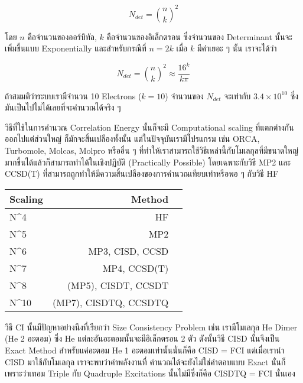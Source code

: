\begin{equation}
    N_{det} = \binom{n}{k}^{2}
\end{equation}

\noindent โดย $n$ คือจำนวนของออร์บิทัล, $k$ คือจำนวนของอิเล็กตรอน ซึ่งจำนวนของ Determinant
นั้นจะเพิ่มขึ้นแบบ Exponentially และสำหรับกรณีที่ $n = 2k$ เมื่อ $k$ มีค่าเยอะ ๆ นั้น เราจะได้ว่า

\begin{equation}
    N_{det} = \binom{n}{k}^{2} \approx \frac{16^k}{k\pi}
\end{equation}

ถ้าสมมติว่าระบบเรามีจำนวน 10 Electrons ($k = 10$) จำนวนของ $N_{det}$ จะเท่ากับ $3.4 \times 10^{10}$
ซึ่งมันเป็นไปไม่ได้เลยที่จะคำนวณได้จริง ๆ

วิธีที่ใช้ในการคำนวณ Correlation Energy นั้นก็จะมี Computational scaling ที่แตกต่างกันออกไปแต่ส่วนใหญ่%
ก็มักจะสิ้นเปลืองทั้งนั้น แต่ในปัจจุบันเรามีโปรแกรม เช่น ORCA, Turbomole, Molcas, Molpro หรืออื่น ๆ
ที่ทำให้เราสามารถใช้วิธีเหล่านี้กับโมเลกุลที่มีขนาดใหญ่มากขึ้นได้แล้วก็สามารถทำได้ในเชิงปฏิบัติ (Practically Possible)
โดยเฉพาะกับวิธี MP2 และ CCSD(T) ที่สามารถถูกทำให้มีความสิ้นเปลืองของการคำนวณเทียบเท่าหรือพอ ๆ กับวิธี HF

\begin{table}[!htp]
    \Large
    \centering
    \begin{tabular}{lrr}\toprule
        Scaling & Method                \\\midrule
        N^4     & HF                    \\
        N^5     & MP2                   \\
        N^6     & MP3, CISD, CCSD       \\
        N^7     & MP4, CCSD(T)          \\
        N^8     & (MP5), CISDT, CCSDT   \\
        N^{10}  & (MP7), CISDTQ, CCSDTQ \\
        \bottomrule
    \end{tabular}
\end{table}

วิธี CI นั้นมีปัญหาอย่างนึงที่เรียกว่า Size Consistency Problem เช่น เรามีโมเลกุล He Dimer (He 2 อะตอม)
ซึ่ง He แต่ละอันอะตอมนั้นจะมีอิเล็กตรอน 2 ตัว ดังนั้นวิธี CISD นั้นจึงเป็น Exact Method สำหรับแค่อะตอม He 1
อะตอมเท่านั้นนั่นก็คือ CISD = FCI แต่เมื่อเรานำ CISD มาใช้กับโมเลกุล  เราจะพบว่าค่าพลังงานที่%
คำนวณได้จะยังไม่ใช่คำตอบแบบ Exact นั่นก็เพราะว่าเทอม Triple กับ Quadruple Excitations นั้นไม่มีซึ่งก็คือ
CISDTQ = FCI นั่นเอง

